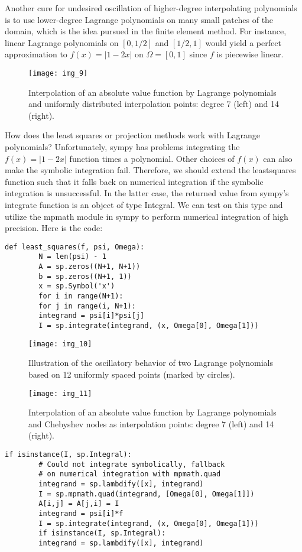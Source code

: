 \documentclass[../main.tex]{subfiles}
\begin{document}
	Another cure for undesired oscillation of higher-degree interpolating polynomials is to use lower-degree Lagrange polynomials on many small patches of the domain, which is the idea pursued in the finite element method. For instance, linear Lagrange polynomials on $[0,1 / 2]$ and $[1 / 2,1]$ would yield a perfect approximation to $f(x)=|1-2 x|$ on $\Omega=[0,1]$ since $f$ is piecewise linear.
	\begin{figure}[H]
		\centering
		\texttt{[image: img\_9]}
		\caption{Interpolation of an absolute value function by Lagrange polynomials and uniformly distributed interpolation points: degree 7 (left) and 14 (right).}
		\label{fig:img_9}
	\end{figure}
	How does the least squares or projection methods work with Lagrange polynomials? Unfortunately, sympy has problems integrating the $f(x)=|1-2 x|$ function times a polynomial. Other choices of $f(x)$ can also make the symbolic integration fail. Therefore, we should extend the least\textunderscore squares function such that it falls back on numerical integration if the symbolic integration is unsuccessful. In the latter case, the returned value from sympy's integrate function is an object of type Integral. We can test on this type and utilize the mpmath module in sympy to perform numerical integration of high precision. Here is the code:
	\begin{lstlisting}[numbers=none]
		def least_squares(f, psi, Omega):
		N = len(psi) - 1
		A = sp.zeros((N+1, N+1))
		b = sp.zeros((N+1, 1))
		x = sp.Symbol('x')
		for i in range(N+1):
		for j in range(i, N+1):
		integrand = psi[i]*psi[j]
		I = sp.integrate(integrand, (x, Omega[0], Omega[1]))	
	\end{lstlisting}
	\begin{figure}[H]
		\centering
		\texttt{[image: img\_10]}
		\caption{Illustration of the oscillatory behavior of two Lagrange polynomials
			based on 12 uniformly spaced points (marked by circles).}
		\label{fig:img_10}
	\end{figure}
	\begin{figure}[H]
		\centering
		\texttt{[image: img\_11]}
		\caption{ Interpolation of an absolute value function by Lagrange polynomials
			and Chebyshev nodes as interpolation points: degree 7 (left) and 14 (right).}
		\label{fig:img_11}
	\end{figure}
	\begin{lstlisting}[numbers=none]
		if isinstance(I, sp.Integral):
		# Could not integrate symbolically, fallback
		# on numerical integration with mpmath.quad
		integrand = sp.lambdify([x], integrand)
		I = sp.mpmath.quad(integrand, [Omega[0], Omega[1]])
		A[i,j] = A[j,i] = I
		integrand = psi[i]*f
		I = sp.integrate(integrand, (x, Omega[0], Omega[1]))
		if isinstance(I, sp.Integral):
		integrand = sp.lambdify([x], integrand)
	\end{lstlisting}
\end{document}
